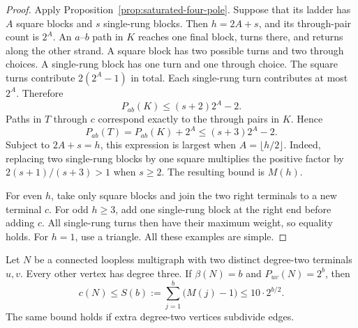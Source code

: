 \begin{proof}
Apply Proposition~\ref{prop:saturated-four-pole}.
Suppose that its ladder has $A$ square blocks and $s$ single-rung blocks.
Then $h=2A+s$, and its through-pair count is $2^A$.
An $a$--$b$ path in $K$ reaches one final block, turns there, and returns along the other strand.
A square block has two possible turns and two through choices.
A single-rung block has one turn and one through choice.
The square turns contribute $2(2^A-1)$ in total.
Each single-rung turn contributes at most $2^A$.
Therefore
\[
 P_{ab}(K)\le (s+2)2^A-2.
\]
Paths in $T$ through $c$ correspond exactly to the through pairs in $K$.
Hence
\[
 P_{ab}(T)=P_{ab}(K)+2^A
 \le(s+3)2^A-2.
\]
Subject to $2A+s=h$, this expression is largest when $A=\lfloor h/2\rfloor$.
Indeed, replacing two single-rung blocks by one square multiplies the positive factor by
$2(s+1)/(s+3)>1$ when $s\ge2$.
The resulting bound is $M(h)$.

For even $h$, take only square blocks and join the two right terminals to a new terminal $c$.
For odd $h\ge3$, add one single-rung block at the right end before adding $c$.
All single-rung turns then have their maximum weight, so equality holds.
For $h=1$, use a triangle.
All these examples are simple.
\end{proof}

\begin{lemma}\label{lem:saturated-two-pole-cycles}
Let $N$ be a connected loopless multigraph with two distinct degree-two terminals $u,v$.
Every other vertex has degree three.
If $\beta(N)=b$ and $P_{uv}(N)=2^b$, then
\[
 c(N)\le S(b):=\sum_{j=1}^b\bigl(M(j)-1\bigr)
 \le10\cdot2^{b/2}.
\]
The same bound holds if extra degree-two vertices subdivide edges.
\end{lemma}

